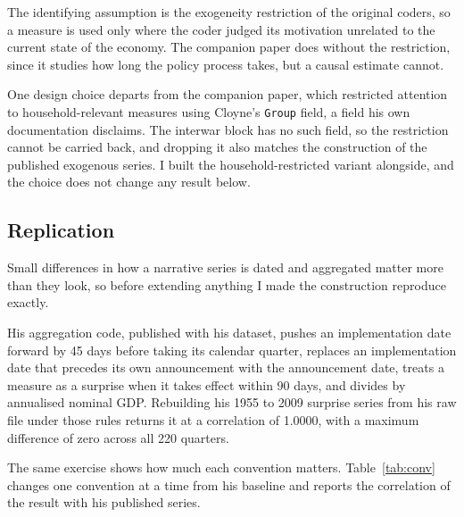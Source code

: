 \documentclass[11pt,a4paper]{article}
\begin{document}
The identifying assumption is the exogeneity restriction of the original coders, so a measure is
used only where the coder judged its motivation unrelated to the current state of the economy. The
companion paper does without the restriction, since it studies how long the policy process takes,
but a causal estimate cannot.

One design choice departs from the companion paper, which restricted attention to household-relevant
measures using Cloyne's \texttt{Group} field, a field his own documentation disclaims. The interwar
block has no such field, so the restriction cannot be carried back, and dropping it also matches the
construction of the published exogenous series. I built the household-restricted variant alongside,
and the choice does not change any result below.

\subsection{Replication}

Small differences in how a narrative series is dated and aggregated matter more than they look, so
before extending anything I made the construction reproduce \citet{cloyne2013} exactly.

His aggregation code, published with his dataset, pushes an implementation date forward by 45 days
before taking its calendar quarter, replaces an implementation date that precedes its own
announcement with the announcement date, treats a measure as a surprise when it takes effect within
90 days, and divides by annualised nominal GDP. Rebuilding his 1955 to 2009 surprise series from his
raw file under those rules returns it at a correlation of 1.0000, with a maximum difference of zero
across all 220 quarters.

The same exercise shows how much each convention matters. Table~\ref{tab:conv} changes one
convention at a time from his baseline and reports the correlation of the result with his published
series.
\end{document}
